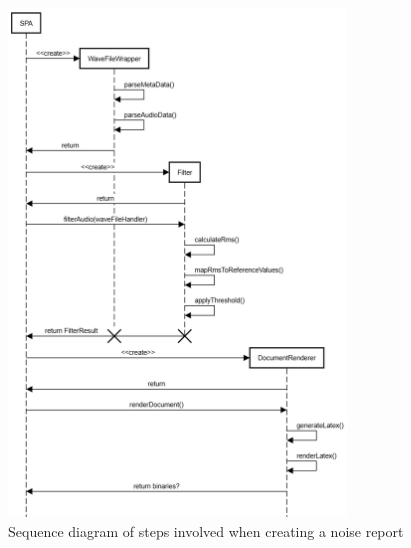 \begin{figure}[H]
    \centering
    \includegraphics[width=0.8\textwidth]{../assets/sequence_diagram_from_wave_file_to_pdf.png}
    \caption{Sequence diagram of steps involved when creating a noise report}\label{fig:sequence-diagram-noise-report}
\end{figure}

